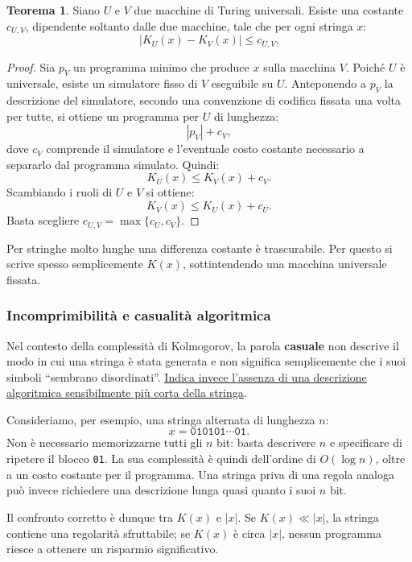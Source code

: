 \documentclass{article}
\theoremstyle{definition}
\newtheorem{theorem}{Teorema}[section] %
\numberwithin{equation}{section}
\begin{document}
\begin{theorem}\label{theorem_kolmogorov_invariance}
    Siano $U$ e $V$ due macchine di Turing universali. Esiste una costante
    $c_{U,V}$, dipendente soltanto dalle due macchine, tale che per ogni stringa
    $x$:
    \[
        \left|K_U(x)-K_V(x)\right|\leq c_{U,V}.
    \]
\end{theorem}

\begin{proof}
    Sia $p_V$ un programma minimo che produce $x$ sulla macchina $V$. Poiché
    $U$ è universale, esiste un simulatore fisso di $V$ eseguibile su $U$.
    Anteponendo a $p_V$ la descrizione del simulatore, secondo una convenzione
    di codifica fissata una volta per tutte, si ottiene un programma per $U$ di
    lunghezza:
    \[
        |p_V|+c_V,
    \]
    dove $c_V$ comprende il simulatore e l'eventuale costo costante necessario
    a separarlo dal programma simulato. Quindi:
    \[
        K_U(x)\leq K_V(x)+c_V.
    \]
    Scambiando i ruoli di $U$ e $V$ si ottiene:
    \[
        K_V(x)\leq K_U(x)+c_U.
    \]
    Basta scegliere
    $c_{U,V}=\max\{c_U,c_V\}$.
\end{proof}

Per stringhe molto lunghe una differenza costante è trascurabile. Per questo si
scrive spesso semplicemente $K(x)$, sottintendendo una macchina universale
fissata.

\subsubsection{Incomprimibilità e casualità algoritmica}
Nel contesto della complessità di Kolmogorov, la parola \textbf{casuale} non descrive il modo in cui una stringa è stata generata e non significa semplicemente che i suoi simboli ``sembrano disordinati''. \uline{Indica invece l'assenza di una descrizione algoritmica sensibilmente più corta della stringa}.

Consideriamo, per esempio, una stringa alternata di lunghezza $n$:
\[
    x=\texttt{010101}\cdots\texttt{01}.
\]
Non è necessario memorizzarne tutti gli $n$ bit: basta descrivere $n$ e
specificare di ripetere il blocco \texttt{01}. La sua complessità è quindi
dell'ordine di $O(\log n)$, oltre a un costo costante per il programma. Una
stringa priva di una regola analoga può invece richiedere una descrizione lunga
quasi quanto i suoi $n$ bit.

Il confronto corretto è dunque tra $K(x)$ e $|x|$. Se
$K(x)\ll |x|$, la stringa contiene una regolarità sfruttabile; se
$K(x)$ è circa $|x|$, nessun programma riesce a ottenere un risparmio
significativo.
\end{document}
